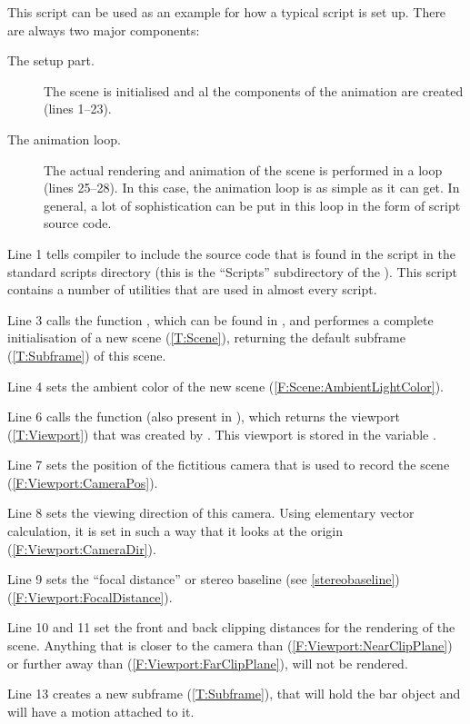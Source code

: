 This script can be used as an example for how a typical script is set up. There are always two major components:
\begin{description}
\item[The setup part.] The scene is initialised and al the components of the animation are created (lines 1--23).
\item[The animation loop.] The actual rendering and animation of the scene is performed in a loop (lines 25--28). In this case, the animation loop is as simple as it can get. In general, a lot of sophistication can be put in this loop in the form of script source code.
\end{description}

Line 1 tells compiler to include the source code that is found in the script  in the standard scripts directory (this is the ``Scripts'' subdirectory of the \datadir). This script contains a number of utilities that are used in almost every script.

Line 3 calls the function , which can be found in , and performes a complete initialisation of a new scene (\ref{T:Scene}), returning the default subframe (\ref{T:Subframe}) of this scene.

Line 4 sets the ambient color of the new scene (\ref{F:Scene:AmbientLightColor}).

Line 6 calls the function  (also present in ), which returns the viewport (\ref{T:Viewport}) that was created by . This viewport is stored in the variable .

Line 7 sets the position of the fictitious camera that is used to record the scene (\ref{F:Viewport:CameraPos}).

Line 8 sets the viewing direction of this camera. Using elementary vector calculation, it is set in such a way that it looks at the origin (\ref{F:Viewport:CameraDir}).

Line 9 sets the ``focal distance'' or stereo baseline (see \ref{stereobaseline}) (\ref{F:Viewport:FocalDistance}).

Line 10 and 11 set the front and back clipping distances for the rendering of the scene. Anything that is closer to the camera than  (\ref{F:Viewport:NearClipPlane}) or further away than  (\ref{F:Viewport:FarClipPlane}), will not be rendered.

Line 13 creates a new subframe (\ref{T:Subframe}), that will hold the bar object and will have a motion attached to it.

